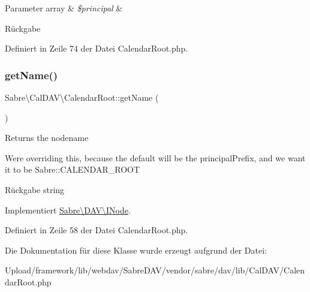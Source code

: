 \begin{DoxyParams}[1]{Parameter}
array & {\em \$principal} & \\
\hline
\end{DoxyParams}
\begin{DoxyReturn}{Rückgabe}

\end{DoxyReturn}


Definiert in Zeile 74 der Datei Calendar\+Root.\+php.

\mbox{\label{class_sabre_1_1_cal_d_a_v_1_1_calendar_root_a360248ff540e3fb0845cf76d17f87ec5}} 
\subsubsection{\texorpdfstring{get\+Name()}{getName()}}
{\footnotesize\ttfamily Sabre\textbackslash{}\+Cal\+D\+A\+V\textbackslash{}\+Calendar\+Root\+::get\+Name (\begin{DoxyParamCaption}{ }\end{DoxyParamCaption})}

Returns the nodename

We\textquotesingle{}re overriding this, because the default will be the \textquotesingle{}principal\+Prefix\textquotesingle{}, and we want it to be Sabre\+::\+C\+A\+L\+E\+N\+D\+A\+R\+\_\+\+R\+O\+OT

\begin{DoxyReturn}{Rückgabe}
string 
\end{DoxyReturn}


Implementiert \mbox{\hyperlink{interface_sabre_1_1_d_a_v_1_1_i_node_ab616fe836b1ae36af12126a2bc934dce}{Sabre\textbackslash{}\+D\+A\+V\textbackslash{}\+I\+Node}}.



Definiert in Zeile 58 der Datei Calendar\+Root.\+php.



Die Dokumentation für diese Klasse wurde erzeugt aufgrund der Datei\+:\begin{DoxyCompactItemize}
\item 
Upload/framework/lib/webdav/\+Sabre\+D\+A\+V/vendor/sabre/dav/lib/\+Cal\+D\+A\+V/Calendar\+Root.\+php\end{DoxyCompactItemize}
